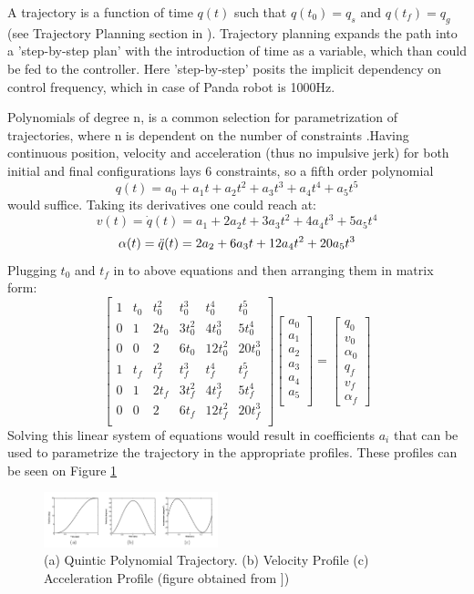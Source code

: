  A trajectory is a function of time $q(t)$ such that $q(t_0)=q_s$ and $q(t_f)=q_g$ (see Trajectory Planning section in \cite{spong}). Trajectory planning expands the path into a 'step-by-step plan' with the introduction of time as a variable, which than could be fed to the controller. Here 'step-by-step' posits the implicit dependency on control frequency, which in case of Panda robot is 1000Hz.
 
 Polynomials of degree n, is a common selection for parametrization of trajectories, where n is dependent on the number of constraints \cite{spong}.Having continuous position, velocity and acceleration (thus no impulsive jerk) for both initial and final configurations lays 6 constraints, so a fifth order polynomial
$$ q(t) = a_0 + a_1t + a_2t^2 + a_3t^3 + a_4t^4 + a_5t^5 $$
would suffice. Taking its derivatives one could reach at:
$$ v(t) = \Dot{q}(t) = a_1 +2 a_2t +3 a_3t^2 +4 a_4t^3 +5 a_5t^4 $$
$$ \alpha(t) = \Ddot{q}(t) = 2 a_2 + 6 a_3t + 12 a_4t^2 + 20 a_5t^3 $$
Plugging $t_0$ and $t_f$ in to above equations and then arranging them in matrix form:
$$\begin{bmatrix}
1 & t_0 & t_0^2 & t_0^3 & t_0^4 & t_0^5 \\
0 & 1 & 2t_0 & 3t_0^2 & 4t_0^3 & 5t_0^4\\
0 & 0 & 2 & 6t_0 & 12t_0^2 & 20t_0^3\\
1 & t_f & t_f^2 & t_f^3 & t_f^4 & t_f^5\\
0 & 1 & 2t_f & 3t_f^2 & 4t_f^3 & 5t_f^4\\
0 & 0 & 2 & 6t_f & 12t_f^2 & 20t_f^3\\ 
\end{bmatrix}
\begin{bmatrix}a_0\\a_1\\a_2\\a_3\\a_4\\a_5\\\end{bmatrix}
=
\begin{bmatrix}q_0\\v_0\\\alpha_0\\q_f\\v_f\\\alpha_f\end{bmatrix}$$
Solving this linear system of equations would result in coefficients $a_i$ that can be used to parametrize the trajectory in the appropriate profiles. These profiles can be seen on Figure \ref{quintics}

 \begin{figure}[ht]
  \centering
  \includegraphics[width=0.45\textwidth]{images/quintics.png}
  \caption{(a) Quintic Polynomial Trajectory. (b) Velocity Profile  (c) Acceleration Profile (figure obtained from \cite{spong}])}
  \label{quintics}
 \end{figure}
